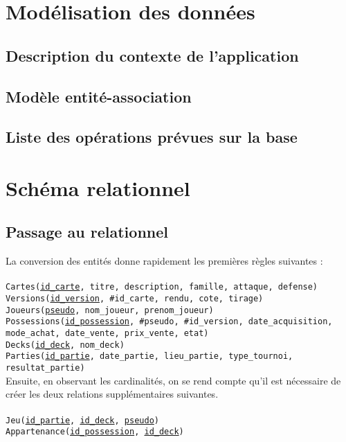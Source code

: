 \documentclass{article}
\begin{document}
\section{Modélisation des données}
\subsection{Description du contexte de l'application}
\subsection{Modèle entité-association}
\subsection{Liste des opérations prévues sur la base}

\section{Schéma relationnel}
\subsection{Passage au relationnel}

La conversion des entités donne rapidement les premières règles suivantes :\\
\\
\texttt{Cartes(\underline{id\_carte}, titre, description, famille, attaque, defense)} \\
\texttt{Versions(\underline{id\_version}, \#id\_carte, rendu, cote, tirage)} \\
\texttt{Joueurs(\underline{pseudo}, nom\_joueur, prenom\_joueur)} \\
\texttt{Possessions(\underline{id\_possession}, \#pseudo, \#id\_version, date\_acquisition, mode\_achat, date\_vente, prix\_vente, etat)} \\
\texttt{Decks(\underline{id\_deck}, nom\_deck)} \\
\texttt{Parties(\underline{id\_partie}, date\_partie, lieu\_partie, type\_tournoi, resultat\_partie)} \\

Ensuite, en observant les cardinalités, on se rend compte qu'il est nécessaire de créer les deux relations supplémentaires suivantes. \\
\\
\texttt{Jeu(\underline{id\_partie}, \underline{id\_deck}, \underline{pseudo})} \\
\texttt{Appartenance(\underline{id\_possession}, \underline{id\_deck})} \\
\end{document}
